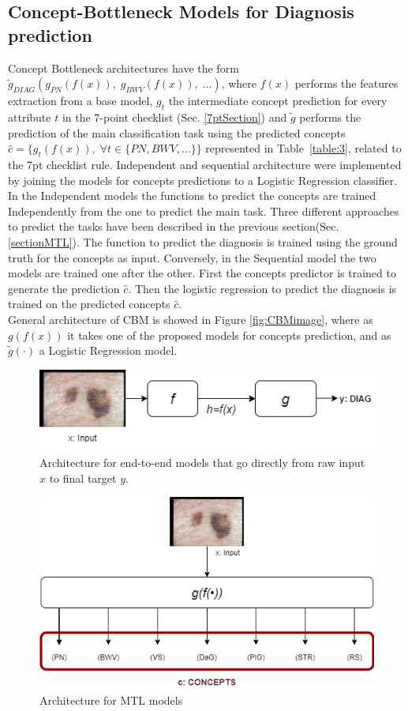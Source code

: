\subsection{Concept-Bottleneck Models for Diagnosis prediction}
Concept Bottleneck architectures have the form $\tilde{g}_{DIAG} \left( g_{PN} \left( f(x) \right),\;  g_{BWV} \left( f(x) \right),\; \hdots \right)$, where $f(x)$ performs the features extraction from a base model, $g_t$ the intermediate concept prediction for every attribute $t$ in the 7-point checklist (Sec. \ref{7ptSection}) and $\tilde{g}$ performs the prediction of the main classification task using the predicted concepts $\hat{c} = \{g_t(f(x)),\; \forall t \in \{ PN, BWV, \hdots \} \}$ represented in Table~\ref{table:3}, related to the 7pt checklist rule. Independent and sequential architecture were implemented by joining the models for concepts predictions to a Logistic Regression classifier. \\
In the Independent models the functions to predict the concepts are trained Independently from the one to predict the main task. Three different approaches to predict the tasks have been described in the previous section(Sec. \ref{sectionMTL}). The function to predict the diagnosis is trained using the ground truth for the concepts as input.
Conversely, in the Sequential model the two models are trained one after the other. First the concepts predictor is trained to generate the prediction $\hat{c}$. Then the logistic regression to predict the diagnosis is trained on the predicted concepts $\hat{c}$.\\
General architecture of CBM is showed in Figure \ref{fig:CBMimage}, where as $g(f(x))$ it takes one of the proposed models for concepts prediction, and as $\tilde{g}(\cdot)$ a Logistic Regression model.
\begin{figure}[]
\centering
  \includegraphics[width=.7\linewidth]{images/model/STL.png}
  \caption{Architecture for end-to-end models that go directly from raw input $x$ to final target $y$.}
  \label{fig:StLimage}
\end{figure}


\begin{figure}[]
\centering
  \includegraphics[width=.7\linewidth]{images/model/MTL (2).png}
  \caption{Architecture for MTL models}
  \label{fig:x_cimage}
\end{figure}

